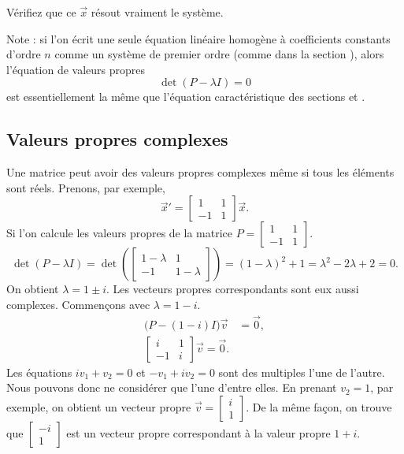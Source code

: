\begin{exercise}
Vérifiez que ce $\vec{x}$ résout vraiment le système.
\end{exercise}

Note : si l'on écrit une seule équation linéaire homogène à coefficients constants d’ordre $n$ comme un système de premier ordre (comme dans la section ),
alors l’équation de valeurs propres
\begin{equation*}
\det(P - \lambda I) = 0
\end{equation*}
est essentiellement la même que l’équation caractéristique des sections
 et .

\subsection{Valeurs propres complexes}

Une matrice peut avoir des valeurs propres complexes même si tous les éléments sont réels. Prenons, par exemple,
\begin{equation*}
{\vec{x}}' = 
\begin{bmatrix}
1 & 1 \\
-1 & 1
\end{bmatrix}
\vec{x} .
\end{equation*}
Si l'on calcule les valeurs propres de la matrice $P = \left[ \begin{smallmatrix} 1 & 1 \\ -1 & 1 \end{smallmatrix}
\right]$.
\begin{equation*}
\det(P - \lambda I) =
\det\left(
\begin{bmatrix}
1-\lambda & 1 \\
-1 & 1-\lambda
\end{bmatrix}
\right)
= {(1-\lambda)}^2 + 1
= \lambda^2 - 2 \lambda + 2 = 0 .
\end{equation*}
On obtient $\lambda = 1 \pm i$.
Les vecteurs propres correspondants sont eux aussi complexes. Commençons avec $\lambda = 1-i$.
\begin{align*}
\bigl(P-(1-i) I\bigr) \vec{v} & = \vec{0} , \\
\begin{bmatrix}
i & 1 \\
-1 & i
\end{bmatrix}
\vec{v} = \vec{0}.
\end{align*}
Les équations $i v_1 + v_2 = 0$ et $-v_1 + iv_2 = 0$
sont des multiples l'une de l'autre. Nous pouvons donc ne considérer que l’une d’entre elles. En prenant $v_2 = 1$, par exemple, on obtient un vecteur propre
$\vec{v} = \left[ \begin{smallmatrix} i \\ 1 \end{smallmatrix} \right]$.
De la même façon, on trouve que
$\left[ \begin{smallmatrix} -i \\ 1 \end{smallmatrix} \right]$
est un vecteur propre correspondant à la valeur propre $1+i$.

